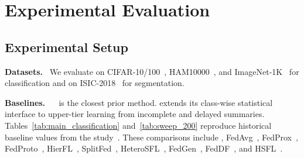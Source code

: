 \section{Experimental Evaluation}
\label{sec:experiments}

\subsection{Experimental Setup}
\label{sec:setup}

\noindent\textbf{Datasets.}~
We evaluate \ehsfp{} on CIFAR-10/100~\cite{krizhevsky2009learning}, HAM10000~\cite{tschandl2018ham10000}, and ImageNet-1K~\cite{5206848} for classification and on ISIC-2018~\cite{codella2019isic2018} for segmentation.

\noindent\textbf{Baselines.}~
\hsfp{}~\cite{tran2026h} is the closest prior method. \ehsfp{} extends its class-wise statistical interface to upper-tier learning from incomplete and delayed summaries. Tables~\ref{tab:main_classification} and~\ref{tab:sweep_200} reproduce historical baseline values from the \hsfp{} study~\cite{tran2026h}. These comparisons include \hsfp{}, FedAvg~\cite{mcmahan2017communication}, FedProx~\cite{li2020federated}, FedProto~\cite{tan2022fedproto}, HierFL~\cite{liu2020client,9488756}, SplitFed~\cite{thapa2022splitfed}, HeteroSFL~\cite{chen2025heterosfl}, FedGen~\cite{zhu2021data}, FedDF~\cite{lin2020ensemble}, and HSFL~\cite{quan2023hiersfl}.

